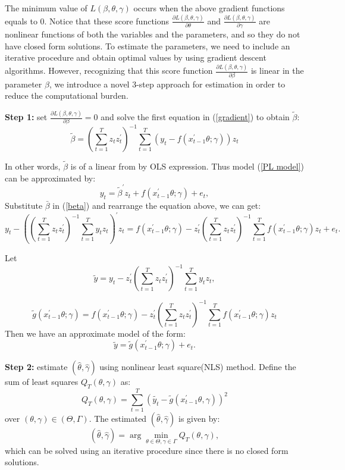 \documentclass[a4paper,12pt,times,numbered,print,index]{report}
\numberwithin{equation}{section}
\begin{document}
The minimum value of $L(\beta, \theta, \gamma)$ occurs when the above gradient functions equals to 0. Notice that these score functions $\frac{\partial L(\beta, \theta, \gamma)}{\partial \theta}$ and $\frac{\partial L(\beta, \theta, \gamma)}{\partial \gamma}$ are nonlinear functions of both the variables and the parameters, and so they do not have closed form solutions. To estimate the parameters, we need to include an iterative procedure and obtain optimal values by using gradient descent algorithms. However, recognizing that this score function $\frac{\partial L(\beta, \theta, \gamma)}{\partial \beta}$ is linear in the parameter $\beta$, we introduce a novel 3-step approach for estimation in order to reduce the computational burden. 

\textbf{Step 1:} set $\frac{\partial L(\beta, \theta, \gamma)}{\partial \beta} = 0$ and solve the first equation in (\ref{gradient}) to obtain $\tilde{\beta}$:
\begin{equation}
\tilde{\beta} = \left( \sum_{t=1}^{T}z_t z_t^{\prime}\right)^{-1}\sum_{t=1}^{T}\left( y_t - f\left( x_{t-1}^{\prime }\theta; \gamma\right)\right) z_t
\label{beta}
\end{equation}

In other words, $\tilde{\beta}$ is of a linear from by OLS expression. Thus model (\ref{PL model}) can be approximated by:
$$
y_t = \tilde{\beta}^{\prime} z_t + f\left( x_{t-1}^{\prime }\theta; \gamma\right) +e_{t},
$$
Substitute $\bar{\beta}$ in (\ref{beta}) and rearrange the equation above, we can get:
$$
y_t - \left( \left( \sum_{t=1}^{T}z_t z_t^{\prime}\right)^{-1} \sum_{t=1}^{T}y_t z_t \right) ^{\prime} z_t = f\left( x_{t-1}^{\prime }\theta; \gamma\right) - z_t^{\prime} \left( \sum_{t=1}^{T}z_t z_t^{\prime}\right)^{-1} \sum_{t=1}^{T} f\left( x_{t-1}^{\prime }\theta; \gamma\right) z_t + e_t.
$$

Let  
$$\tilde{y} = y_t -  z_t^{\prime}  \left( \sum_{t=1}^{T}z_t z_t^{\prime}\right)^{-1} \sum_{t=1}^{T}y_t z_t, $$ 

$$\tilde{g} ( x_{t-1}^{\prime }\theta; \gamma) = f\left( x_{t-1}^{\prime }\theta; \gamma\right) - z_t^{\prime} \left( \sum_{t=1}^{T}z_t z_t^{\prime}\right)^{-1} \sum_{t=1}^{T} f\left( x_{t-1}^{\prime }\theta; \gamma\right) z_t$$ 
Then we have an approximate model of the form:
\begin{equation}
\tilde{y} = \tilde{g}\left( x_{t-1}^{\prime }\theta; \gamma\right) + e_t.
\label{trans_model}
\end{equation}

\textbf{Step 2: } estimate $(\hat{\theta}, \hat{\gamma})$ using nonlinear least square(NLS) method. Define the sum of least squares $Q_{T}(\theta, \gamma)$ as:
$$
Q_{T}(\theta, \gamma)=\sum_{t=1}^{T}\left(\tilde{y_{t}}-\tilde{g}\left(x_{t-1}^{\prime} \theta, \gamma\right)\right)^{2}
$$
over $(\theta, \gamma) \in (\Theta, \Gamma)$.
The estimated $(\hat{\theta}, \hat{\gamma})$ is given by:
\begin{equation*}
\left( \widehat{\theta},\widehat{\gamma}\right) =\arg \min_{\theta \in \Theta
	,\gamma \in \Gamma }Q_{T}\left( \theta ,\gamma \right),  \label{nls_c3}
\end{equation*}%
which can be solved using an iterative procedure since there is no closed form solutions. 
\end{document}
